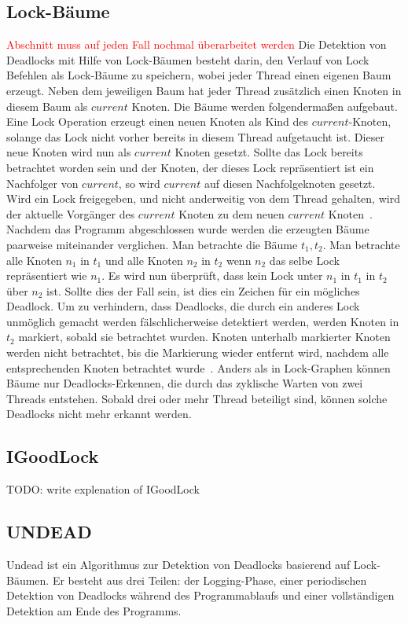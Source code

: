 \subsection{Lock-Bäume}
\textcolor{red}{Abschnitt muss auf jeden Fall nochmal überarbeitet werden}
Die Detektion von Deadlocks mit Hilfe von Lock-Bäumen besteht darin, den 
Verlauf von Lock Befehlen als Lock-Bäume zu speichern, wobei jeder Thread 
einen eigenen Baum erzeugt. Neben dem jeweiligen Baum hat jeder Thread 
zusätzlich einen Knoten in diesem Baum als $current$ Knoten.
Die Bäume werden folgendermaßen aufgebaut. Eine Lock Operation erzeugt einen 
neuen Knoten als Kind des $current$-Knoten, solange das Lock nicht vorher 
bereits in diesem Thread aufgetaucht ist. Dieser neue Knoten wird nun als 
$current$ Knoten gesetzt. Sollte das Lock bereits betrachtet worden sein und 
der Knoten, der dieses Lock repräsentiert ist ein Nachfolger von $current$, so 
wird $current$ auf diesen Nachfolgeknoten gesetzt. Wird ein Lock freigegeben,
und nicht anderweitig von dem Thread gehalten, wird der aktuelle Vorgänger des 
$current$ Knoten zu dem neuen $current$ Knoten~\cite{havelund}.\\
Nachdem das Programm abgeschlossen wurde werden die erzeugten Bäume paarweise 
miteinander verglichen. Man betrachte die Bäume $t_1, t_2$. Man betrachte 
alle Knoten $n_1$ in $t_1$ und alle Knoten $n_2$ in $t_2$ wenn $n_2$ das selbe 
Lock repräsentiert wie $n_1$. Es wird nun überprüft, dass kein Lock unter $n_1$
in $t_1$ in $t_2$ über $n_2$ ist. Sollte dies der Fall sein, ist dies ein Zeichen 
für ein mögliches Deadlock. Um zu verhindern, dass Deadlocks, die durch ein 
anderes Lock unmöglich gemacht werden fälschlicherweise detektiert werden,
werden Knoten in $t_2$ markiert, sobald sie betrachtet wurden. Knoten unterhalb
markierter Knoten werden nicht betrachtet, bis die Markierung wieder entfernt wird,
nachdem alle entsprechenden Knoten betrachtet wurde~\cite{havelund}.
Anders als in Lock-Graphen können Bäume nur Deadlocks-Erkennen, die durch das 
zyklische Warten von zwei Threads entstehen. Sobald drei oder mehr Thread beteiligt
sind, können solche Deadlocks nicht mehr erkannt werden.

\subsection*{IGoodLock}
TODO: write explenation of IGoodLock

\subsection{UNDEAD}
Undead \cite{zhou} ist ein Algorithmus zur Detektion von Deadlocks basierend auf
Lock-Bäumen. Er besteht aus drei Teilen: der Logging-Phase, einer periodischen
Detektion von Deadlocks während des Programmablaufs und einer vollständigen
Detektion am Ende des Programms.\\ \\
